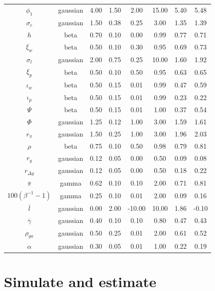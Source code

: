 \documentclass[11pt]{article}
\begin{document}
\begin{table}
\begin{tabular}[t]{cccccccc}
$\phi_1$ & gaussian & 4.00 & 1.50 & 2.00 & 15.00 & 5.40 & 5.48\\
$\sigma_c$ & gaussian & 1.50 & 0.38 & 0.25 & 3.00 & 1.35 & 1.39\\
$h$ & beta & 0.70 & 0.10 & 0.00 & 0.99 & 0.77 & 0.71\\
$\xi_w$ & beta & 0.50 & 0.10 & 0.30 & 0.95 & 0.69 & 0.73\\
\addlinespace
$\sigma_l$ & gaussian & 2.00 & 0.75 & 0.25 & 10.00 & 1.60 & 1.92\\
$\xi_p$ & beta & 0.50 & 0.10 & 0.50 & 0.95 & 0.63 & 0.65\\
$\iota_w$ & beta & 0.50 & 0.15 & 0.01 & 0.99 & 0.47 & 0.59\\
$\iota_p$ & beta & 0.50 & 0.15 & 0.01 & 0.99 & 0.23 & 0.22\\
$\Psi$ & beta & 0.50 & 0.15 & 0.01 & 1.00 & 0.37 & 0.54\\
\addlinespace
$\Phi$ & gaussian & 1.25 & 0.12 & 1.00 & 3.00 & 1.59 & 1.61\\
$r_\pi$ & gaussian & 1.50 & 0.25 & 1.00 & 3.00 & 1.96 & 2.03\\
$\rho$ & beta & 0.75 & 0.10 & 0.50 & 0.98 & 0.79 & 0.81\\
$r_y$ & gaussian & 0.12 & 0.05 & 0.00 & 0.50 & 0.09 & 0.08\\
$r_{\Delta y}$ & gaussian & 0.12 & 0.05 & 0.00 & 0.50 & 0.18 & 0.22\\
\addlinespace
$\overline{\pi}$ & gamma & 0.62 & 0.10 & 0.10 & 2.00 & 0.71 & 0.81\\
$100(\beta^{-1} -1)$ & gamma & 0.25 & 0.10 & 0.01 & 2.00 & 0.09 & 0.16\\
$\overline{l}$ & gaussian & 0.00 & 2.00 & -10.00 & 10.00 & 1.86 & -0.10\\
$\overline{\gamma}$ & gaussian & 0.40 & 0.10 & 0.10 & 0.80 & 0.47 & 0.43\\
$\rho_{ga}$ & gaussian & 0.50 & 0.25 & 0.01 & 2.00 & 0.61 & 0.52\\
\addlinespace
$\alpha$ & gaussian & 0.30 & 0.05 & 0.01 & 1.00 & 0.22 & 0.19\\
\bottomrule
\end{tabular}
\end{table}

\clearpage

\hypertarget{sec:simulate-estimate}{%
\section{Simulate and estimate}\label{sec:simulate-estimate}}
\end{document}
